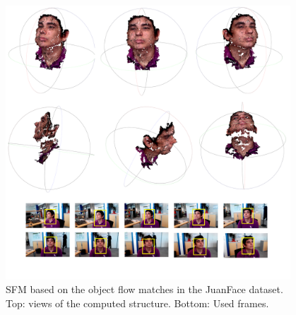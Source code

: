    \begin{figure}[tpbh]
      \centering
      \includegraphics[width=0.95\textwidth]{../images/SFM3_1.png}
      \caption{ SFM based on the object flow matches in the JuanFace dataset. Top: views of the computed structure. Bottom: Used frames. }
      \label{sfm3}
   \end{figure}
